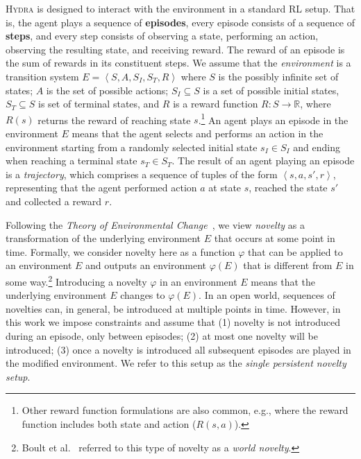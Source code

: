 \documentclass[letterpaper]{article} %
\newcommand{\tuple}[1]{\ensuremath{\left \langle #1 \right \rangle }} %
\newcommand{\reals}{\ensuremath{\mathbb{R}}} %
\newcommand{\hydra}{\textsc{Hydra}\xspace} %
\begin{document}
\hydra is designed to interact with the environment in a standard RL setup. 
That is, the agent plays a sequence of \textbf{episodes}, 
every episode consists of a sequence of \textbf{steps},
and every step consists of observing a state, 
performing an action, 
observing the resulting state, 
and receiving reward. 
The reward of an episode is the sum of rewards in its constituent steps.
We assume that the \emph{environment} is a transition system $E=\tuple{S, A, S_I, S_T, R}$
where $S$ is the possibly infinite set of states;
$A$ is the set of possible actions; 
$S_I\subseteq S$ is a set of possible initial states, 
$S_T\subseteq S$ is set of terminal states, 
and $R$ is a reward function $R: S\rightarrow \reals$, where $R(s)$ returns the reward of reaching state $s$.\footnote{Other reward function formulations are also common, e.g., where the reward function includes both state and action ($R(s,a)$).}
An agent plays an episode in the environment $E$ 
means that the agent selects and performs an action in the environment starting 
from a randomly selected initial state $s_I\in S_I$ and ending when reaching a terminal state $s_T\in S_T$. 
The result of an agent playing an episode is a \emph{trajectory}, which comprises a sequence of tuples of the form $\tuple{s, a, s',r}$, representing that the agent performed action $a$ at state $s$, reached the state $s'$ and collected a reward $r$. 




Following the \emph{Theory of Environmental Change}~\cite{langley2020open}, 
we view \emph{novelty} as a transformation of the underlying environment $E$ that occurs at some point in time.
Formally, we consider novelty here as a function $\varphi$ that can be applied to an environment $E$ and outputs an environment $\varphi(E)$ 
that is different from $E$ in some way.\footnote{Boult et al.~\cite{boult2021towards} referred to this type of novelty as a \emph{world novelty}.}
Introducing a novelty $\varphi$ in an environment $E$ means that the underlying environment $E$ changes to $\varphi(E)$. 
In an open world, sequences of novelties can, in general, be introduced at multiple points in time. 
However, in this work we impose constraints and assume that 
(1) novelty is not introduced during an episode, only between episodes;
(2) at most one novelty will be introduced;
(3) once a novelty is introduced all subsequent episodes are played in the modified environment. 
We refer to this setup as the \emph{single persistent novelty setup}. 
\end{document}
